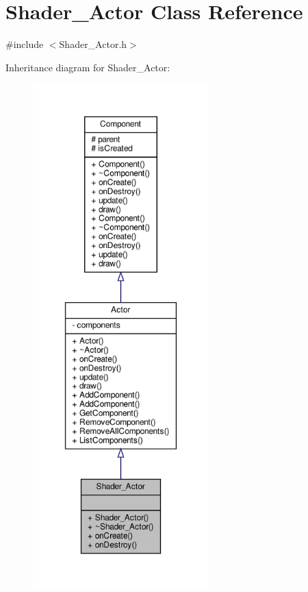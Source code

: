 \hypertarget{classShader__Actor}{}\section{Shader\+\_\+\+Actor Class Reference}
\label{classShader__Actor}


{\ttfamily \#include $<$Shader\+\_\+\+Actor.\+h$>$}



Inheritance diagram for Shader\+\_\+\+Actor\+:
\nopagebreak
\begin{figure}[H]
\begin{center}
\leavevmode
\includegraphics[height=550pt]{classShader__Actor__inherit__graph}
\end{center}
\end{figure}


